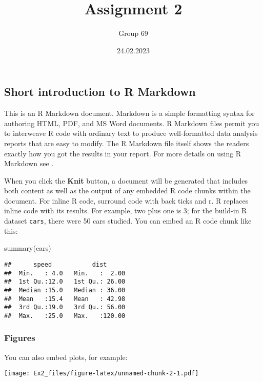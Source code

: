 \documentclass[
  11pt,
]{article}
\title{Assignment 2}
\author{Group 69}
\date{24.02.2023}
\newenvironment{Shaded}{\begin{snugshade}}{\end{snugshade}}
\newcommand{\FunctionTok}[1]{\textcolor[rgb]{0.00,0.00,0.00}{#1}}
\newcommand{\NormalTok}[1]{#1}
\begin{document}
\maketitle

\hypertarget{short-introduction-to-r-markdown}{%
\subsection{Short introduction to R
Markdown}\label{short-introduction-to-r-markdown}}

This is an R Markdown document. Markdown is a simple formatting syntax
for authoring HTML, PDF, and MS Word documents. R Markdown files permit
you to interweave R code with ordinary text to produce well-formatted
data analysis reports that are easy to modify. The R Markdown file
itself shows the readers exactly how you got the results in your report.
For more details on using R Markdown see
\href{http://rmarkdown.rstudio.com}{}.

When you click the \textbf{Knit} button, a document will be generated
that includes both content as well as the output of any embedded R code
chunks within the document. For inline R code, surround code with back
ticks and r. R replaces inline code with its results. For example, two
plus one is 3; for the build-in R dataset \texttt{cars}, there were 50
cars studied. You can embed an R code chunk like this:

\begin{Shaded}
\begin{Highlighting}[]
\FunctionTok{summary}\NormalTok{(cars)}
\end{Highlighting}
\end{Shaded}

\begin{verbatim}
##      speed           dist       
##  Min.   : 4.0   Min.   :  2.00  
##  1st Qu.:12.0   1st Qu.: 26.00  
##  Median :15.0   Median : 36.00  
##  Mean   :15.4   Mean   : 42.98  
##  3rd Qu.:19.0   3rd Qu.: 56.00  
##  Max.   :25.0   Max.   :120.00
\end{verbatim}

\hypertarget{figures}{%
\subsubsection{Figures}\label{figures}}

You can also embed plots, for example:

\texttt{[image: Ex2\_files/figure-latex/unnamed-chunk-2-1.pdf]}
\end{document}
